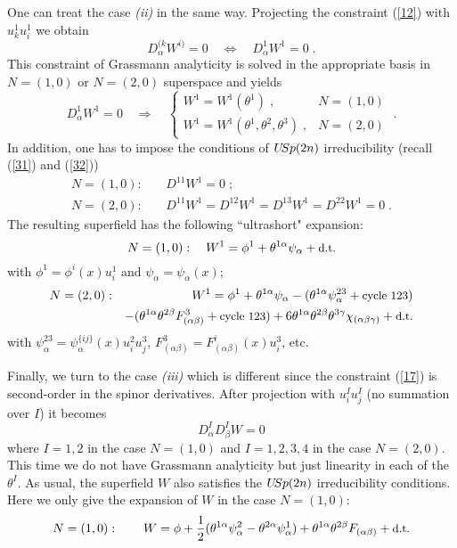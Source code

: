 \documentclass[a4paper,12pt]{article}
\begin{document}
   
One can treat the case {\sl (ii)} in the same way. Projecting the 
constraint (\ref{12}) with $u^1_ku^1_i$ we obtain 
\begin{equation}\label{40}
  D^{(k}_\alpha W^{i)}=0 \quad \Leftrightarrow \quad D^1_\alpha 
W^1 = 0\;.
\end{equation}
This constraint of Grassmann analyticity is solved in the 
appropriate basis in $N=(1,0)$ or $N=(2,0)$ superspace and yields
\begin{equation}\label{41}
  D^1_\alpha 
W^1 = 0  \quad \Rightarrow \quad \left\{ 
  \begin{array}{ll}
    W^1 = W^1(\theta^1)\;,  & N=(1,0) \\
     W^1 = W^1(\theta^1,\theta^2,\theta^3)\;,  & N=(2,0)
  \end{array}
 \right. \;.
\end{equation}
In addition, one has to impose the conditions of $U\hskip-2pt 
Sp(2n)$ irreducibility (recall (\ref{31}) and (\ref{32})) 
\begin{eqnarray}
 N=(1,0):  &\ & D^{11}W^1=0\;;\label{42}\\ 
  N=(2,0):  &\ & D^{11}W^1=D^{12}W^1=D^{13}W^1=D^{22}W^1=0\;.\label{43}
\end{eqnarray}
The resulting superfield has the following ``ultrashort" 
expansion: 
\begin{equation}\label{44}
   N=(1,0):  \quad W^1 = \phi^1 + \theta^{1\alpha}\psi_\alpha + \mbox{\small d.t.} 
\end{equation}
with $\phi^1=\phi^i(x)u^1_i$ and $\psi_\alpha=\psi_\alpha(x)$;
\begin{eqnarray}
  N=(2,0): && W^1 = \phi^1 + \theta^{1\alpha}\psi_\alpha -
(\theta^{1\alpha}\psi^{23}_\alpha + \mbox{\small cycle 123}) 
\label{45} \\ 
  && - (\theta^{1\alpha}\theta^{2\beta}F^3_{(\alpha\beta)} + \mbox{\small cycle 123})
+ 6 \theta^{1\alpha}\theta^{2\beta} 
\theta^{3\gamma}\chi_{(\alpha\beta\gamma)}  + \mbox{\small d.t.}  
\nonumber 
\end{eqnarray}
with $\psi^{23}_\alpha = \psi^{\{ij\}}_\alpha(x) u^2_i u^3_j$, 
$F^3_{(\alpha\beta)} = F^i_{(\alpha\beta)}(x)u^3_i$, etc. 
 
Finally, we turn to the case {\sl (iii)} which is different since 
the constraint (\ref{17}) is second-order in the spinor 
derivatives. After projection with $u^I_iu^I_j$ (no summation over 
$I$) it becomes 
\begin{equation}\label{47}
  D^I_\alpha  D^I_\beta  W = 0
\end{equation}
where $I=1,2$ in the case $N=(1,0)$ and $I=1,2,3,4$ in the case 
$N=(2,0)$. This time we do not have Grassmann analyticity but just 
linearity in each of the $\theta^I$. As usual, the superfield $W$ 
also satisfies the $U\hskip-2pt Sp(2n)$ irreducibility conditions. 
Here we only give the expansion of $W$ in the case $N=(1,0)$: 
\begin{equation}\label{47'}
N=(1,0): \qquad  W = \phi  + {1\over 
2}(\theta^{1\alpha}\psi^2_\alpha - \theta^{2\alpha}\psi^1_\alpha) 
+ \theta^{1\alpha}\theta^{2\beta} F_{(\alpha\beta)} + \mbox{\small 
d.t.}  
\end{equation}
 
\end{document}

